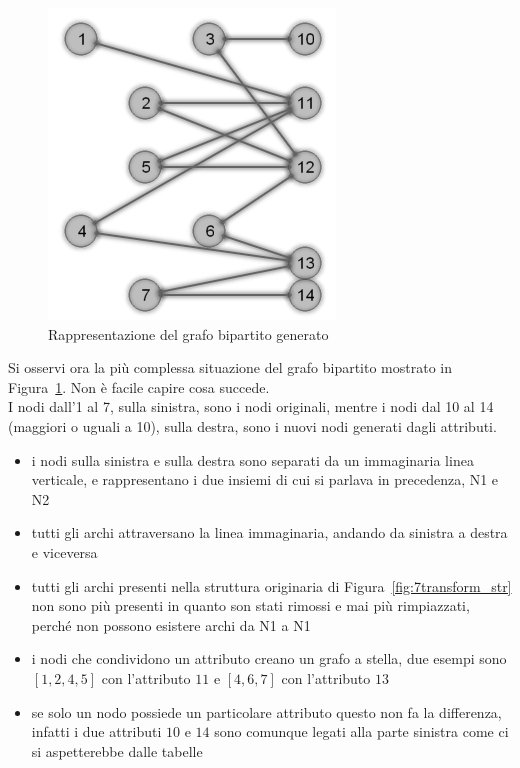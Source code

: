 %
\begin{figure}[htp]
	\centering
	\includegraphics{immagini/7transform_bipartite}
	\caption{Rappresentazione del grafo bipartito generato}
	\label{fig:7transform_bipartite}
\end{figure}
%
Si osservi ora la più complessa situazione del grafo bipartito mostrato in Figura~\ref{fig:7transform_bipartite}. Non è facile capire cosa succede.\\
I nodi dall'1 al 7, sulla sinistra, sono i nodi originali, mentre i nodi dal 10 al 14 (maggiori o uguali a 10), sulla destra, sono i nuovi nodi generati dagli attributi.
\begin{itemize}
	\item i nodi sulla sinistra e sulla destra sono separati da un immaginaria linea verticale, e rappresentano i due insiemi di cui si parlava in precedenza, N1 e N2
	\item tutti gli archi attraversano la linea immaginaria, andando da sinistra a destra e viceversa
	\item tutti gli archi presenti nella struttura originaria di Figura~\ref{fig:7transform_str} non sono più presenti in quanto son stati rimossi e mai più rimpiazzati, perché non possono esistere archi da N1 a N1
	\item i nodi che condividono un attributo creano un grafo a stella, due esempi sono $[1,2,4,5]$ con l'attributo $11$ e $[4,6,7]$ con l'attributo $13$
	\item se solo un nodo possiede un particolare attributo questo non fa la differenza, infatti i due attributi $10$ e $14$ sono comunque legati alla parte sinistra come ci si aspetterebbe dalle tabelle
\end{itemize}
%



